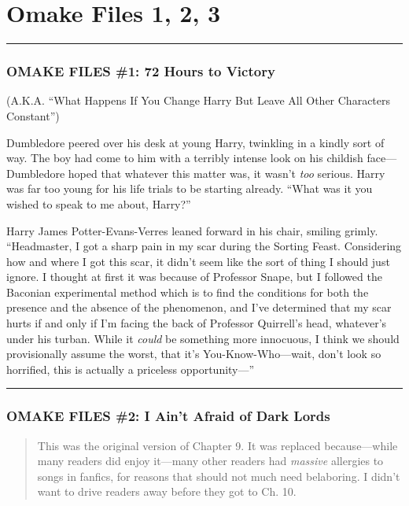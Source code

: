 \chapter{Omake Files 1, 2, 3}

\begin{center}\rule{3in}{0.4pt}\end{center}

\subsection{OMAKE FILES \#1: 72 Hours to Victory}

(A.K.A. ``What Happens If You Change Harry But Leave All Other
Characters Constant'')

Dumbledore peered over his desk at young Harry, twinkling in a kindly
sort of way. The boy had come to him with a terribly intense look on his
childish face---Dumbledore hoped that whatever this matter was, it
wasn't \emph{too} serious. Harry was far too young for his life trials
to be starting already. ``What was it you wished to speak to me about,
Harry?''

Harry James Potter-Evans-Verres leaned forward in his chair, smiling
grimly. ``Headmaster, I got a sharp pain in my scar during the Sorting
Feast. Considering how and where I got this scar, it didn't seem like
the sort of thing I should just ignore. I thought at first it was
because of Professor Snape, but I followed the Baconian experimental
method which is to find the conditions for both the presence and the
absence of the phenomenon, and I've determined that my scar hurts if and
only if I'm facing the back of Professor Quirrell's head, whatever's
under his turban. While it \emph{could} be something more innocuous, I
think we should provisionally assume the worst, that it's
You-Know-Who---wait, don't look so horrified, this is actually a
priceless opportunity---''

\begin{center}\rule{3in}{0.4pt}\end{center}

\subsection{OMAKE FILES \#2: I Ain't Afraid of Dark Lords}

\begin{quote}
This was the original version of Chapter 9. It was replaced
because---while many readers did enjoy it---many other readers had
\emph{massive} allergies to songs in fanfics, for reasons that should
not much need belaboring. I didn't want to drive readers away before
they got to Ch. 10.
\end{quote}

